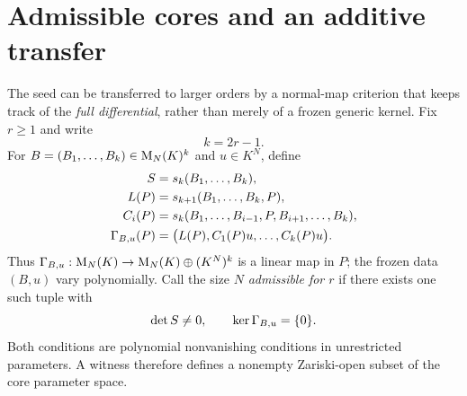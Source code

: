 \section{Admissible cores and an additive transfer}\label{sec:even-cores}
The seed can be transferred to larger orders by a normal-map
criterion that keeps track of the \emph{full differential}, rather
than merely of a frozen generic kernel. Fix $r\ge1$ and write
\begin{equation}\label{eq:even-rk}
 k=2r-1.
\end{equation}
For $B=(B_1,\ldots,B_k)\in\mathrm{M}_N(K)^k$ and
$u\in K^N$, define
\begin{equation}\label{eq:core-definitions}
\begin{aligned}
 S&=s_k(B_1,\ldots,B_k),\\
 L(P)&=s_{k+1}(B_1,\ldots,B_k,P),\\
 C_i(P)&=s_k(B_1,\ldots,B_{i-1},P,B_{i+1},\ldots,B_k),\\
 \Gamma_{B,u}(P)&=\bigl(L(P),C_1(P)u,\ldots,C_k(P)u\bigr).
\end{aligned}
\end{equation}
Thus $\Gamma_{B,u}:\mathrm{M}_N(K)\to\mathrm{M}_N(K)\oplus(K^N)^k$
is a linear map in $P$; the frozen data $(B,u)$ vary
polynomially. Call the size $N$ \emph{admissible for $r$} if
there exists one such tuple with
\begin{equation}\label{eq:core-admissible}
 \det S\ne0,\qquad \ker\Gamma_{B,u}=\{0\}.
\end{equation}
Both conditions are polynomial nonvanishing conditions in
unrestricted parameters. A witness therefore defines a nonempty
Zariski-open subset of the core parameter space.

